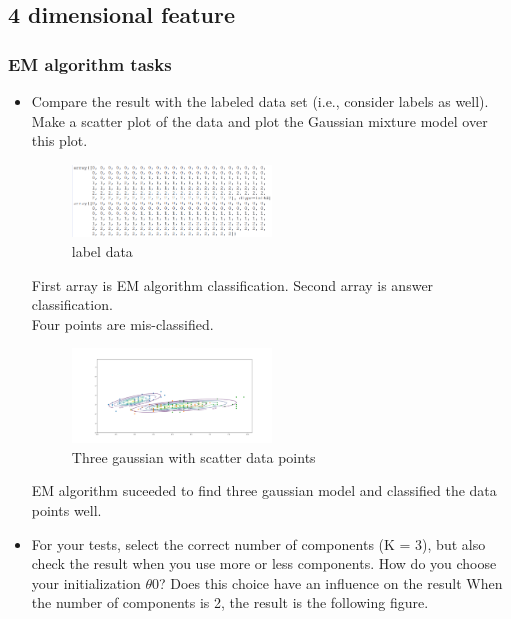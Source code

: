 \documentclass[a4paper]{article}
\begin{document}
	\subsection{4 dimensional feature}
	\subsubsection{EM algorithm tasks}
	\begin{itemize}
		\item Compare the result with the labeled data set (i.e., consider labels as well). Make a scatter plot of the data and plot the Gaussian mixture model over this plot.
		
		\begin{figure}[h]
			\begin{center}
				\includegraphics[width=0.5\textwidth]{4_number_diff.png}
				\caption{label data}
			\end{center}
		\end{figure}
		First array is EM algorithm classification. Second array is answer classification.\\
		Four points are mis-classified.
		
		\begin{figure}[h]
			\begin{center}
				\includegraphics[width=0.5\textwidth]{4_gauss.png}
				\caption{Three gaussian with scatter data points}
			\end{center}
		\end{figure}
		
		EM algorithm suceeded to find three gaussian model and classified the data points well.
		\clearpage
		\item For your tests, select the correct number of components (K = 3), but also check the result when you use more or less components. How do you choose your initialization $\theta$0? Does this choice have an inﬂuence on the result
		When the number of components is 2, the result is the following figure.
		

\end{itemize}
\end{document}
